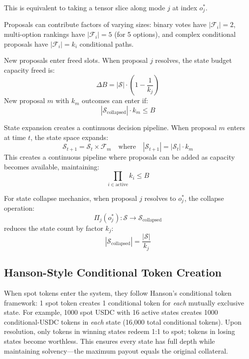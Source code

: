 \documentclass{article}
\begin{document}
    This is equivalent to taking a tensor slice along mode $j$ at index $o_j^*$.

Proposals can contribute factors of varying sizes: binary votes have $|\mathcal{F}_i| = 2$, multi-option rankings have $|\mathcal{F}_i| = 5$ (for 5 options), and complex conditional proposals have $|\mathcal{F}_i| = k_i$ conditional paths.

New proposals enter freed slots. When proposal $j$ resolves, the state budget capacity freed is:
    \begin{equation}
    \Delta B = |\mathcal{S}| \cdot \left(1 - \frac{1}{k_j}\right)
    \end{equation}
    New proposal $m$ with $k_m$ outcomes can enter if:
    \begin{equation}
    |\mathcal{S}_{\text{collapsed}}| \cdot k_m \leq B
    \end{equation}

State expansion creates a continuous decision pipeline. When proposal $m$ enters at time $t$, the state space expands:
    \begin{equation}
    \mathcal{S}_{t+1} = \mathcal{S}_t \times \mathcal{F}_m \quad \text{where} \quad |\mathcal{S}_{t+1}| = |\mathcal{S}_t| \cdot k_m
    \end{equation}
    This creates a continuous pipeline where proposals can be added as capacity becomes available, maintaining:
    \begin{equation}
    \prod_{i \in \text{active}} k_i \leq B
    \end{equation}

For state collapse mechanics, when proposal $j$ resolves to $o_j^*$, the collapse operation:
    \begin{equation}
    \Pi_j(o_j^*): \mathcal{S} \rightarrow \mathcal{S}_{\text{collapsed}}
    \end{equation}
    reduces the state count by factor $k_j$:
    \begin{equation}
    |\mathcal{S}_{\text{collapsed}}| = \frac{|\mathcal{S}|}{k_j}
    \end{equation}

\subsection{Hanson-Style Conditional Token Creation}
When spot tokens enter the system, they follow Hanson's conditional token framework: 1 spot token creates 1 conditional token for \textit{each} mutually exclusive state. For example, 1000 spot USDC with 16 active states creates 1000 conditional-USDC tokens in \textit{each} state (16,000 total conditional tokens). Upon resolution, only tokens in winning states redeem 1:1 to spot; tokens in losing states become worthless. This ensures every state has full depth while maintaining solvency—the maximum payout equals the original collateral.
\end{document}

